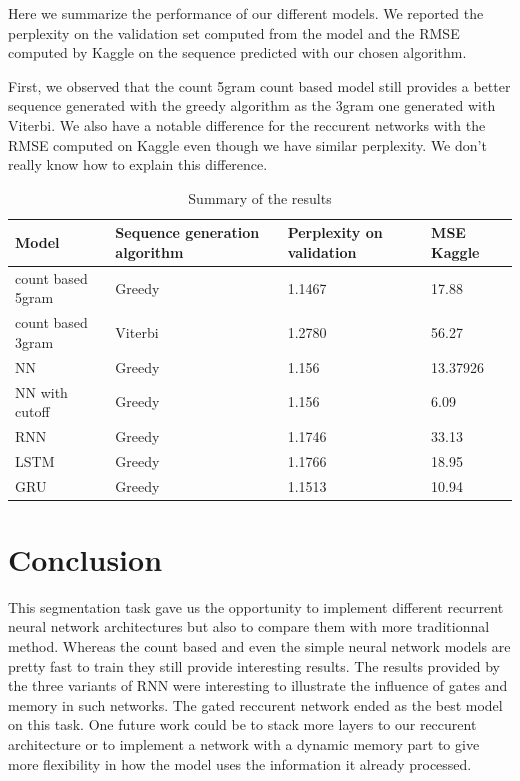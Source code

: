 \documentclass[11pt]{article}
\begin{document}
Here we summarize the performance of our different models. We reported the perplexity on the validation set computed from the model and the RMSE computed by Kaggle on the sequence predicted with our chosen algorithm.

First, we observed that the count 5gram count based model still provides a better sequence generated with the greedy algorithm as the 3gram one generated with Viterbi.
We also have a notable difference for the reccurent networks with the RMSE computed on Kaggle even though we have similar perplexity. We don't really know how to explain this difference.

\begin{table}[H]
\centering
\caption{Summary of the results}
\begin{tabular}{|l|l|l|l|}
\hline
Model             & Sequence generation algorithm & Perplexity on validation & MSE Kaggle \\ \hline
count based 5gram & Greedy                        & 1.1467                   & 17.88       \\ \hline
count based 3gram & Viterbi                       & 1.2780                   & 56.27       \\ \hline
NN                & Greedy                             & 1.156                        & 13.37926           \\ \hline
NN with cutoff               & Greedy                           &       1.156                  & 6.09           \\ \hline
RNN               & Greedy                        & 1.1746                   & 33.13       \\ \hline
LSTM              & Greedy                        & 1.1766                   & 18.95       \\ \hline
GRU               & Greedy                        & 1.1513                   & 10.94       \\ \hline
\end{tabular}
\end{table}


\section{Conclusion}

This segmentation task gave us the opportunity to implement different recurrent neural network architectures but also to compare them with more traditionnal method. Whereas the count based and even the simple neural network models are pretty fast to train they still provide interesting results. The results provided by the three variants of RNN were interesting to illustrate the influence of gates and memory in such networks. The gated reccurent network ended as the best model on this task. One future work could be to stack more layers to our reccurent architecture or to implement a network with a dynamic memory part to give more flexibility in how the model uses the information it already processed.
\end{document}
